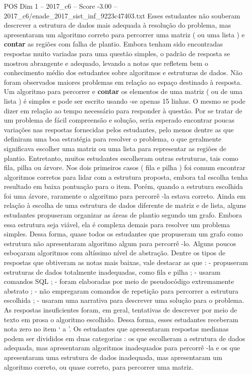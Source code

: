 \begin{textsample}{POS Dim 1 – 2017\_c6 – Score -3.00 – 2017\_c6/enade\_2017\_sist\_inf\_9223c47403.txt}
Esses estudantes não souberam descrever a estrutura de dados mais adequada à resolução do problema, mas apresentaram um algoritmo correto para percorrer uma matriz ( ou uma lista ) e \textbf{contar} as regiões com falha de plantio.
Embora tenham sido encontradas respostas muito variadas para uma questão simples, o padrão de resposta se mostrou abrangente e adequado, levando a notas que refletem bem o conhecimento médio dos estudantes sobre algoritmos e estruturas de dados.
Não foram observados maiores problemas em relação ao espaço destinado à resposta.
Um algoritmo para percorrer e \textbf{contar} os elementos de uma matriz ( ou de uma lista ) é simples e pode ser escrito usando -se apenas 15 linhas.
O mesmo se pode dizer em relação ao tempo necessário para responder à questão.
Por se tratar de um problema de fácil compreensão e solução, seria esperado encontrar poucas variações nas respostas fornecidas pelos estudantes, pelo menos dentre as que definiram uma boa estratégia para resolver o problema, o que geralmente significava escolher uma matriz ou uma lista para representar as regiões de plantio.
Entretanto, muitos estudantes escolheram outras estruturas, tais como fila, pilha ou árvore.
Nos dois primeiros casos ( fila e pilha ) foi comum encontrar algoritmos corretos para lidar com a estrutura proposta, embora tal escolha tenha resultado em baixa pontuação para o item.
Porém, quando a estrutura escolhida foi uma árvore, raramente o algoritmo para percorrê -la estava correto.
Ainda em relação à escolha de uma estrutura de dados diferente de matriz e de lista, alguns estudantes propuseram organizar as áreas de plantio segundo um grafo.
Embora essa estrutura seja viável, ela é complexa demais para resolver um problema simples.
Dessa forma, quase todos os estudantes que propuseram um grafo como estrutura não apresentaram algoritmo algum para percorrê -lo.
Alguns poucos esboçaram algoritmos com altíssimo nível de abstração.
Dentre os tipos de respostas que obtiveram as notas mais baixas, vale destacar as que : - propuseram estruturas de dados totalmente inadequadas, como fila e pilha ; - usaram comandos SQL ; - foram elaboradas por meio de pseudocódigo extremamente abstrato ; - não empregaram comandos de repetição para percorrer a estrutura escolhida ; - usaram uma narrativa para descrever uma solução para o problema.
As respostas insuficientes foram, em geral, tentativas de descrever por meio de texto em prosa o algoritmo escolhido.
Dessa forma, esses estudantes receberam nota zero no item ‘ a ’.
Os estudantes que apresentaram respostas medianas podem ser divididos em duas categorias : os que escolheram a estrutura de dados adequada, mas apresentaram algoritmos inadequados para percorrê -la e os que apresentaram uma estrutura de dados inadequada, mas apresentaram um algoritmo correto, ou quase correto, para percorrer uma matriz.

\end{textsample}
